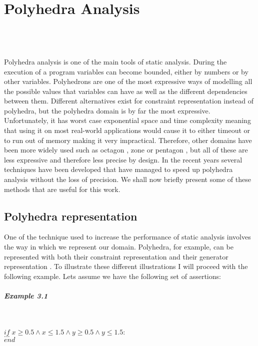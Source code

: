 
\chapter{Polyhedra Analysis}
\mbox{}\\
\mbox{}\\
\mbox{}\\
Polyhedra analysis is one of the main tools of static analysis\cite{cousot1977abstract}. During the execution of a program variables can become bounded, either by numbers or by other variables. Polyhedrons are one of the most expressive ways of modelling all the possible values that variables can have as well as the different dependencies between them. Different alternatives exist for constraint representation instead of polyhedra, but the polyhedra domain is by far the most expressive. Unfortunately, it has worst case exponential space and time complexity meaning that using it on most real-world applications would cause it to either timeout or to run out of memory making it very impractical. Therefore, other domains have been more widely used such as octagon \cite{mine2006octagon}, zone \cite{mine2001new} or pentagon \cite{logozzo2010pentagons} , but all of these are less expressive and therefore less precise by design. In the recent years several techniques have been developed that have managed to speed up polyhedra analysis without the loss of precision\cite{gange2016exploiting,jourdan2017sparsity,marechal2017efficient}. We shall now briefly present some of these methods that are useful for this work.

\section{Polyhedra representation}
One of the technique used to increase the performance of static analysis involves the way in which we represent our domain\cite{singh2015making}. Polyhedra, for example, can be represented with both their constraint representation and their generator representation\cite{motzkin1953double} . To illustrate these different illustrations I will proceed with the following example. Lets assume we have the following set of assertions:
\paragraph{Example 3.1}\mbox{}\\
\begin{center}
	$if \; x\geq0.5\wedge x\leq 1.5 \wedge y\geq 0.5 \wedge y \leq1.5: $\\
	$...\;\;\;\;\;$\\
	$end \qquad\qquad\qquad\qquad\qquad\qquad\qquad\qquad$
\end{center}

